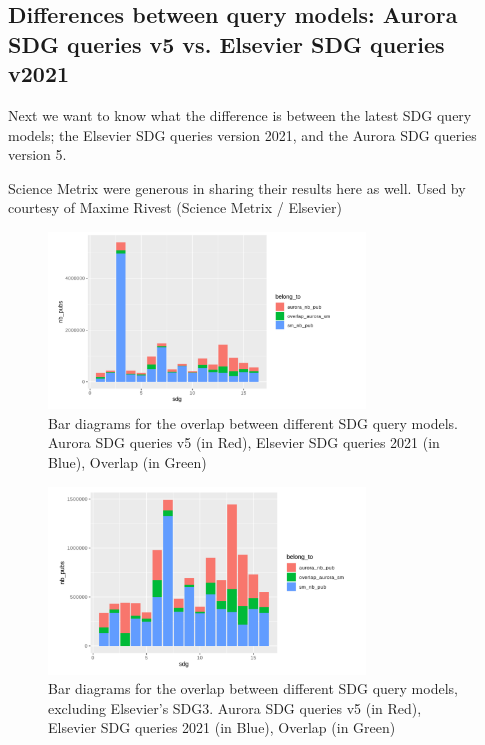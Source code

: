 \documentclass{article}
\begin{document}
\subsection{Differences between query models: Aurora SDG queries v5 vs. Elsevier SDG queries v2021}

Next we want to know what the difference is between the latest SDG query models; the Elsevier SDG queries version 2021, and the Aurora SDG queries version 5.

Science Metrix were generous in sharing their results here as well.
Used by courtesy of Maxime Rivest (Science Metrix / Elsevier)

\begin{figure}[H]
	\centering
  \includegraphics[width=0.75\textwidth]{figures/aurora-elsevier-venn/overlap-aurora-elsevier-absolutes.png}
	\caption{Bar diagrams for the overlap between different SDG query models.  Aurora SDG queries v5 (in Red), Elsevier SDG queries 2021 (in Blue), Overlap (in Green)}
\end{figure}

\begin{figure}[H]
	\centering
  \includegraphics[width=0.75\textwidth]{figures/aurora-elsevier-venn/overlap-aurora-elsevier-absolutes2.png}
	\caption{Bar diagrams for the overlap between different SDG query models, excluding Elsevier's SDG3. Aurora SDG queries v5 (in Red), Elsevier SDG queries 2021 (in Blue), Overlap (in Green)}
\end{figure}
\end{document}
